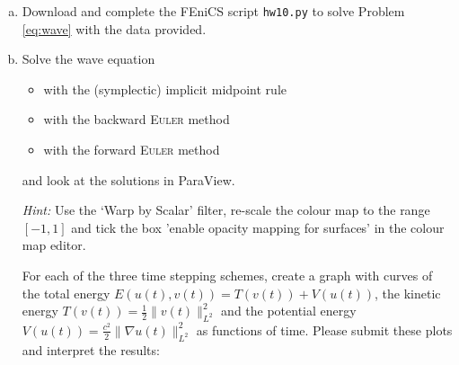 \begin{enumerate}[(a)]
\item %
Download and complete the \textsf{FEniCS} script \texttt{hw10.py} to solve Problem \eqref{eq:wave} with the data provided.
\item %
Solve the wave equation
\begin{itemize}
\item with the (symplectic) implicit midpoint rule
\item with the backward \textsc{Euler} method
\item with the forward \textsc{Euler} method
\end{itemize}
and look at the solutions in \textsf{ParaView}.

\emph{Hint:} Use the `Warp by Scalar' filter, re-scale the colour map to the range $[-1,1]$ and tick the box 'enable opacity mapping for surfaces' in the colour map editor.

For each of the three time stepping schemes, create a graph with curves of the total energy $E(u(t),v(t)) = T(v(t)) + V(u(t))$, the kinetic energy $T(v(t)) = \frac{1}{2}\lVert v(t) \rVert_{L^2}^2$ and the potential energy $V(u(t)) = \frac{c^2}{2}\lVert \nabla u(t) \rVert_{L^2}^2$ as functions of time. Please submit these plots and interpret the results:
\end{enumerate}

